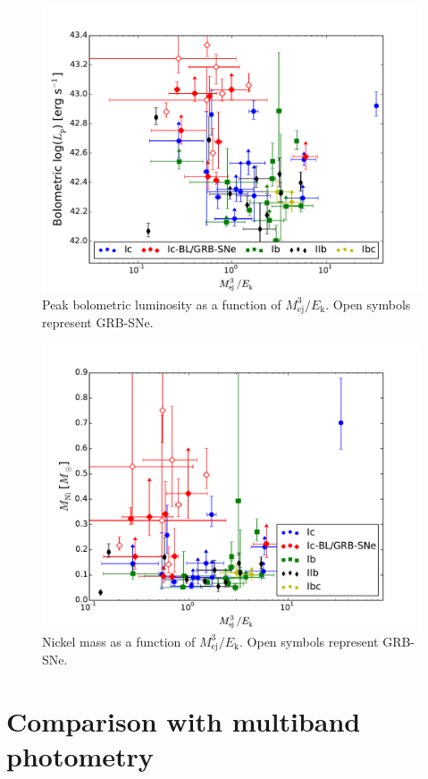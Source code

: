 \documentclass[a4paper,fleqn,usenatbib]{mnras}
\begin{document}
\begin{figure}
\centering
\includegraphics[scale=0.4]{Lp-v-MoverE.pdf}
\caption{Peak bolometric luminosity as a function of $M_{\mathrm{ej}}^3/E_{\mathrm{k}}$. Open symbols represent GRB-SNe.}
\label{fig:LpM3E}
\end{figure}

\begin{figure}
\centering
\includegraphics[scale=0.4]{Mni-v-MoverE.pdf}
\caption{Nickel mass as a function of $M_{\mathrm{ej}}^3/E_{\mathrm{k}}$. Open symbols represent GRB-SNe.}
\label{fig:MniM3E}
\end{figure}

\section{Comparison with multiband photometry}
\end{document}
